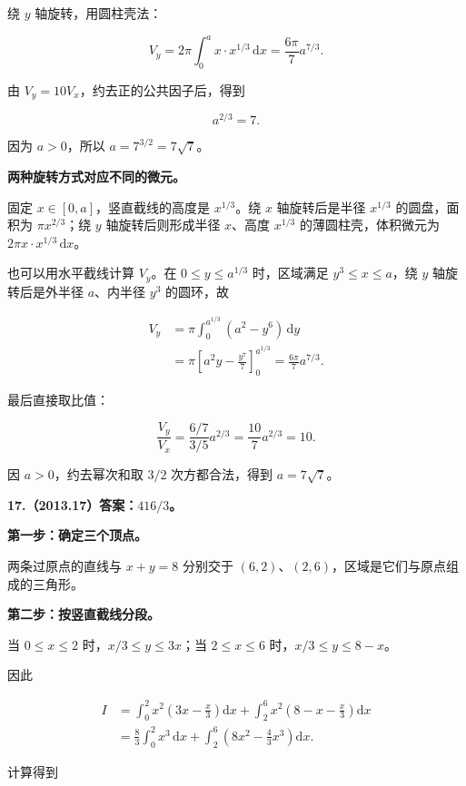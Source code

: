 \documentclass[UTF8,11pt,fontset=windows]{ctexart}
\begin{document}
绕 $y$ 轴旋转，用圆柱壳法：

$$
V_y=2\pi\int_0^a x\cdot x^{1/3}\,\mathrm dx=\frac{6\pi}{7}a^{7/3}.
$$

由 $V_y=10V_x$，约去正的公共因子后，得到

$$
a^{2/3}=7.
$$

因为 $a>0$，所以 $a=7^{3/2}=7\sqrt7$。

\textbf{两种旋转方式对应不同的微元。}

固定 $x\in[0,a]$，竖直截线的高度是 $x^{1/3}$。绕 $x$ 轴旋转后是半径 $x^{1/3}$ 的圆盘，面积为 $\pi x^{2/3}$；绕 $y$ 轴旋转后则形成半径 $x$、高度 $x^{1/3}$ 的薄圆柱壳，体积微元为 $2\pi x\cdot x^{1/3}\,\mathrm dx$。

也可以用水平截线计算 $V_y$。在 $0\le y\le a^{1/3}$ 时，区域满足 $y^3\le x\le a$，绕 $y$ 轴旋转后是外半径 $a$、内半径 $y^3$ 的圆环，故

$$
\begin{aligned}
V_y&=\pi\int_0^{a^{1/3}}(a^2-y^6)\,\mathrm dy\\
&=\pi\left[a^2y-\frac{y^7}{7}\right]_0^{a^{1/3}}
=\frac{6\pi}{7}a^{7/3}.
\end{aligned}
$$

最后直接取比值：

$$
\frac{V_y}{V_x}=\frac{6/7}{3/5}a^{2/3}
=\frac{10}{7}a^{2/3}=10.
$$

因 $a>0$，约去幂次和取 $3/2$ 次方都合法，得到 $a=7\sqrt7$。

\clearpage

\textbf{17.（2013.17）答案：$416/3$。}

\textbf{第一步：确定三个顶点。}

两条过原点的直线与 $x+y=8$ 分别交于 $(6,2)$、$(2,6)$，区域是它们与原点组成的三角形。

\textbf{第二步：按竖直截线分段。}

当 $0\le x\le2$ 时，$x/3\le y\le3x$；当 $2\le x\le6$ 时，$x/3\le y\le8-x$。

因此

$$
\begin{aligned}
I&=\int_0^2x^2\left(3x-\frac x3\right)\mathrm dx
+\int_2^6x^2\left(8-x-\frac x3\right)\mathrm dx\\
&=\frac83\int_0^2x^3\,\mathrm dx
+\int_2^6\left(8x^2-\frac43x^3\right)\mathrm dx.
\end{aligned}
$$

计算得到
\end{document}
